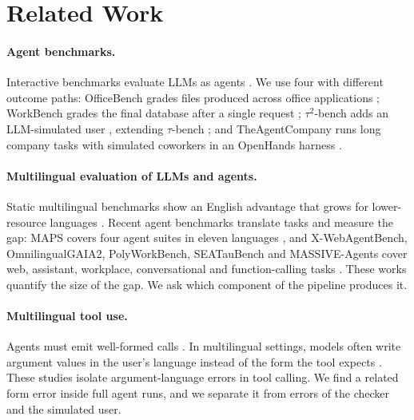 \documentclass[11pt]{article}
\newcommand{\OB}{OfficeBench}
\newcommand{\WB}{WorkBench}
\newcommand{\TAU}{$\tau^2$-bench}
\newcommand{\TAC}{TheAgentCompany}
\begin{document}
\section{Related Work}

\paragraph{Agent benchmarks.} Interactive benchmarks evaluate LLMs as agents
\citep{liu2023agentbench,zhou2024webarena,xie2024osworld,jimenez2024swebench,mialon2024gaia}.
We use four with different outcome paths: \OB{} grades files produced across office applications
\citep{wang2024officebench}; \WB{} grades the final database after a single request
\citep{styles2024workbench}; \TAU{} adds an LLM-simulated user \citep{barres2025tau2}, extending
$\tau$-bench \citep{yao2024taubench}; and \TAC{} runs long company tasks with simulated coworkers
in an OpenHands harness \citep{xu2024theagentcompany,wang2025openhands}.

\paragraph{Multilingual evaluation of LLMs and agents.} Static multilingual benchmarks show an
English advantage that grows for lower-resource languages
\citep{conneau2018xnli,ahuja2023mega,shi2023mgsm,bandarkar2024belebele,huang2023notall,zhang2023dont,etxaniz2024multilingual}.
Recent agent benchmarks translate tasks and measure the gap: MAPS covers four agent suites in
eleven languages \citep{hofman2026maps}, and X-WebAgentBench, OmnilingualGAIA2, PolyWorkBench,
SEATauBench and MASSIVE-Agents cover web, assistant, workplace, conversational and
function-calling tasks
\citep{wang2025xwebagentbench,caciolai2026omnilingualgaia2,li2026polyworkbench,nguyen2026seataubench,kulkarni2025massiveagents}.
These works quantify the size of the gap. We ask which component of the pipeline produces it.

\paragraph{Multilingual tool use.} Agents must emit well-formed calls
\citep{schick2023toolformer,qin2024toolllm,patil2024gorilla}. In multilingual settings, models
often write argument values in the user's language instead of the form the tool expects
\citep{luo2026lost,chauhan2026api}. These studies isolate argument-language errors in tool
calling. We find a related form error inside full agent runs, and we separate it from errors of
the checker and the simulated user.
\end{document}
